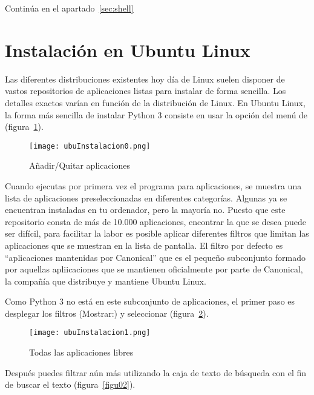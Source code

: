 Continúa en el apartado~\ref{sec:shell}

\section{Instalación en Ubuntu Linux}

Las diferentes distribuciones existentes hoy día de Linux suelen disponer de vastos repositorios de aplicaciones listas para instalar de forma sencilla. Los detalles exactos varían en función de la distribución de Linux. En Ubuntu Linux, la forma más sencilla de instalar Python 3 consiste en usar la opción  del menú de  (figura~\ref{figu00}).

\begin{figure}[!h]
  \begin{center}
\texttt{[image: ubuInstalacion0.png]}
\caption{Añadir/Quitar aplicaciones}\label{figu00}
  \end{center}
\end{figure}

Cuando ejecutas por primera vez el programa para  aplicaciones, se muestra una lista de aplicaciones preseleccionadas en diferentes categorías. Algunas ya se encuentran instaladas en tu ordenador, pero la mayoría no. Puesto que este repositorio consta de más de 10.000 aplicaciones, encontrar la que se desea puede ser difícil, para facilitar la labor es posible aplicar diferentes filtros que limitan las aplicaciones que se muestran en la lista de pantalla. El filtro por defecto es ``aplicaciones mantenidas por Canonical'' que es el pequeño subconjunto formado por aquellas apliicaciones que se mantienen oficialmente por parte de Canonical, la compañía que distribuye y mantiene Ubuntu Linux.

Como Python 3 no está en este subconjunto de aplicaciones, el primer paso es desplegar los filtros (Mostrar:) y seleccionar  (figura~\ref{figu01}).

\begin{figure}[!h]
  \begin{center}
\texttt{[image: ubuInstalacion1.png]}
\caption{Todas las aplicaciones libres}\label{figu01}
  \end{center}
\end{figure}

Después puedes filtrar aún más utilizando la caja de texto de búsqueda con el fin de buscar el texto  (figura~\ref{figu02}).


